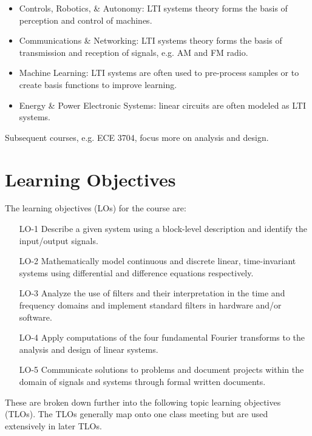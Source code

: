 \begin{itemize}
\item Controls, Robotics, \& Autonomy: LTI systems theory forms the basis of perception and control of machines.
\item Communications \& Networking: LTI systems theory forms the basis of transmission and reception of signals, e.g. AM and FM radio.
\item Machine Learning: LTI systems are often used to pre-process samples or to create basis functions to improve learning.
\item Energy \& Power Electronic Systems: linear circuits are often modeled as LTI systems.
\end{itemize}

Subsequent courses, e.g. ECE 3704, focus more on analysis and design.

\section{Learning Objectives}

The learning objectives (LOs) for the course are:
\begin{enumerate}
\item[LO-1] Describe a given system using a block-level description and identify the input/output signals.
\item[LO-2] Mathematically model continuous and discrete linear, time-invariant systems using differential and difference equations respectively.
\item[LO-3] Analyze the use of filters and their interpretation in the time and frequency domains and implement standard filters in hardware and/or software.
\item[LO-4] Apply computations of the four fundamental Fourier transforms to the analysis and design of linear systems.
\item[LO-5] Communicate solutions to problems and document projects within the domain of signals and systems through formal written documents.
\end{enumerate}

These are broken down further into the following topic learning objectives (TLOs).  The TLOs generally map onto one class meeting but are used extensively in later TLOs.

